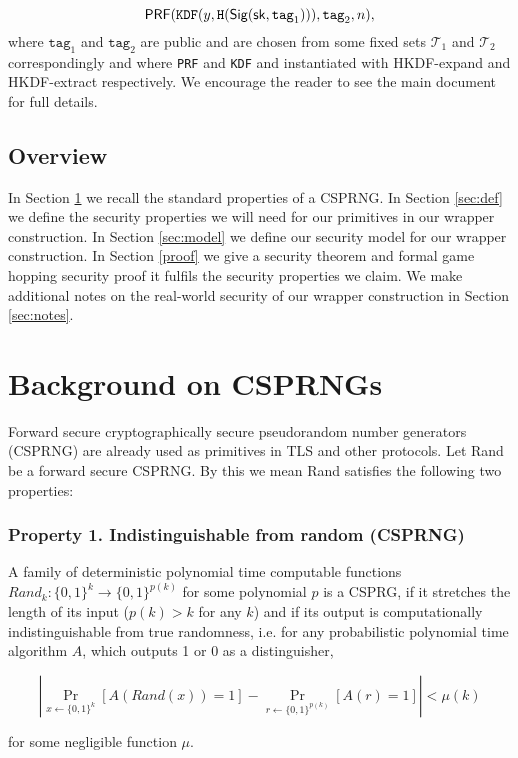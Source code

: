 \documentclass{article}
\begin{document}
$$
\mathsf{PRF}(\texttt{KDF}(y, \texttt{H}(\mathsf{Sig} (\mathsf{sk}, \texttt{tag}_1))), \texttt{tag}_2, n),
$$
where $\texttt{tag}_1$ and $\texttt{tag}_2$ are public and are chosen
from some fixed sets $\mathcal{T}_1$ and $\mathcal{T}_2$ correspondingly and where \texttt{PRF} and \texttt{KDF} and instantiated with HKDF-expand and HKDF-extract respectively. We encourage the reader to see the main document for full details.

\subsection*{Overview}
In Section \ref{CSPRNG} we recall the standard properties of a CSPRNG. In Section \ref{sec:def} we define the security properties we will need for our primitives in our wrapper construction. In Section \ref{sec:model} we define our security model for our wrapper construction. In Section \ref{proof} we give a security theorem and formal game hopping security proof it fulfils the security properties we claim. We make additional notes on the real-world security of our wrapper construction in Section \ref{sec:notes}.


\section{Background on CSPRNGs} \label{CSPRNG}
Forward secure cryptographically secure pseudorandom number generators (CSPRNG) are already used as primitives in TLS and other protocols. Let Rand be a forward secure CSPRNG. By this we mean Rand satisfies the following two properties:

\subsubsection*{Property 1. Indistinguishable from random (CSPRNG)}

A family of deterministic polynomial time computable functions $Rand_{k} \colon \{0, 1\}^{k} \rightarrow \{0, 1 \}^{p(k)}$ for some polynomial $p$ is a  CSPRG, if it stretches the length of its input ($p(k) > k$ for any $k$) and if its output is computationally indistinguishable from true randomness, i.e. for any probabilistic polynomial time algorithm $A$, which outputs 1 or 0 as a distinguisher,

$$ |\Pr_{x\gets\{0,1\}^k}[A(Rand(x))=1] - \Pr_{r\gets\{0,1\}^{p(k)}}[A(r)=1]| < \mu(k) $$

\noindent for some negligible function $\mu$.
\end{document}
